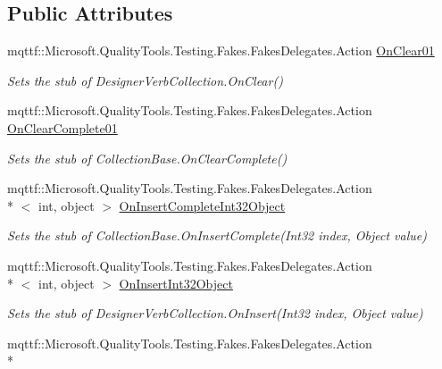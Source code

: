 \subsection*{Public Attributes}
\begin{DoxyCompactItemize}
\item 
mqttf\-::\-Microsoft.\-Quality\-Tools.\-Testing.\-Fakes.\-Fakes\-Delegates.\-Action \hyperlink{class_system_1_1_component_model_1_1_design_1_1_fakes_1_1_stub_designer_verb_collection_aeeafcd0a1a21d8d2ac8ed916873a4e01}{On\-Clear01}
\begin{DoxyCompactList}\small\item\em Sets the stub of Designer\-Verb\-Collection.\-On\-Clear()\end{DoxyCompactList}\item 
mqttf\-::\-Microsoft.\-Quality\-Tools.\-Testing.\-Fakes.\-Fakes\-Delegates.\-Action \hyperlink{class_system_1_1_component_model_1_1_design_1_1_fakes_1_1_stub_designer_verb_collection_a61fc8479092c6065daaaa944163703fe}{On\-Clear\-Complete01}
\begin{DoxyCompactList}\small\item\em Sets the stub of Collection\-Base.\-On\-Clear\-Complete()\end{DoxyCompactList}\item 
mqttf\-::\-Microsoft.\-Quality\-Tools.\-Testing.\-Fakes.\-Fakes\-Delegates.\-Action\\*
$<$ int, object $>$ \hyperlink{class_system_1_1_component_model_1_1_design_1_1_fakes_1_1_stub_designer_verb_collection_aafc24149d90f1ac43d7a9de6c2f2b1f1}{On\-Insert\-Complete\-Int32\-Object}
\begin{DoxyCompactList}\small\item\em Sets the stub of Collection\-Base.\-On\-Insert\-Complete(\-Int32 index, Object value)\end{DoxyCompactList}\item 
mqttf\-::\-Microsoft.\-Quality\-Tools.\-Testing.\-Fakes.\-Fakes\-Delegates.\-Action\\*
$<$ int, object $>$ \hyperlink{class_system_1_1_component_model_1_1_design_1_1_fakes_1_1_stub_designer_verb_collection_a77aa1984d8c21ccc207e880c4b84de55}{On\-Insert\-Int32\-Object}
\begin{DoxyCompactList}\small\item\em Sets the stub of Designer\-Verb\-Collection.\-On\-Insert(\-Int32 index, Object value)\end{DoxyCompactList}\item 
mqttf\-::\-Microsoft.\-Quality\-Tools.\-Testing.\-Fakes.\-Fakes\-Delegates.\-Action\\*

\end{DoxyCompactItemize}
